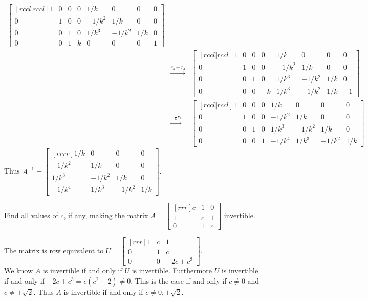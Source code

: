 \begin{solution}
\begin{eqnarray*}
\begin{bmatrix}[rccl|rccl]
1&0&0&0&1/k&0&0&0\\
0&1&0&0&-1/k^2&1/k&0&0\\
0&0&1&0&1/k^3&-1/k^2&1/k&0\\
0&0&1&k&0&0&0&1
\end{bmatrix}\\
&\xrightarrow[]{r_3 - r_4}&
\begin{bmatrix}[rccl|rccl]
1&0&0&0&1/k&0&0&0\\
0&1&0&0&-1/k^2&1/k&0&0\\
0&0&1&0&1/k^3&-1/k^2&1/k&0\\
0&0&0&-k&1/k^3&-1/k^2&1/k&-1
\end{bmatrix}\\
&\xrightarrow[]{-\frac{1}{k}r_4}&
\begin{bmatrix}[rccl|rccl]
1&0&0&0&1/k&0&0&0\\
0&1&0&0&-1/k^2&1/k&0&0\\
0&0&1&0&1/k^3&-1/k^2&1/k&0\\
0&0&0&1&-1/k^4&1/k^3&-1/k^2&1/k
\end{bmatrix}
\end{eqnarray*}
Thus $A^{-1}=\begin{bmatrix}[rrrr]
1/k&0&0&0\\
-1/k^2&1/k&0&0\\
1/k^3&-1/k^2&1/k&0\\
-1/k^4&1/k^3&-1/k^2&1/k
\end{bmatrix}$.
\end{solution}

\ii Find all values of $c$, if any, making the matrix $A=\begin{bmatrix}[rrr]
c&1&0\\
1&c&1\\
0&1&c
\end{bmatrix}$
invertible.
\\
\begin{solution} The matrix is row equivalent to $U=\begin{bmatrix}[rrr]
1&c&1\\
0&1&c\\
0&0&-2c+c^3
\end{bmatrix}$.
\vspace{.1in}\\
We know $A$ is invertible if and only if $U$ is invertible. Furthermore $U$ is invertible if and only if $-2c+c^3=c(c^2-2)\ne 0$. This is the case if and only if $c\ne 0$ and $c\ne \pm \sqrt{2}$. Thus $A$ is invertible if and only if $c \neq 0, \pm\sqrt{2}$.
\end{solution}

